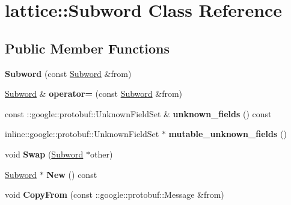 \hypertarget{classlattice_1_1Subword}{
\section{lattice::Subword Class Reference}
\label{classlattice_1_1Subword}
}
\subsection*{Public Member Functions}
\begin{DoxyCompactItemize}
\item 
\hypertarget{classlattice_1_1Subword_aa0e10ac48dd649a4dddf8e1a6ef9b810}{
{\bfseries Subword} (const \hyperlink{classlattice_1_1Subword}{Subword} \&from)}
\label{classlattice_1_1Subword_aa0e10ac48dd649a4dddf8e1a6ef9b810}

\item 
\hypertarget{classlattice_1_1Subword_a102d4bfb0a00050e86aa85c3d8d1ef20}{
\hyperlink{classlattice_1_1Subword}{Subword} \& {\bfseries operator=} (const \hyperlink{classlattice_1_1Subword}{Subword} \&from)}
\label{classlattice_1_1Subword_a102d4bfb0a00050e86aa85c3d8d1ef20}

\item 
\hypertarget{classlattice_1_1Subword_aff470f65348c81181cffe6659c9e3d17}{
const ::google::protobuf::UnknownFieldSet \& {\bfseries unknown\_\-fields} () const }
\label{classlattice_1_1Subword_aff470f65348c81181cffe6659c9e3d17}

\item 
\hypertarget{classlattice_1_1Subword_a1fc937024a7c533e1c51d7adedffa24d}{
inline::google::protobuf::UnknownFieldSet $\ast$ {\bfseries mutable\_\-unknown\_\-fields} ()}
\label{classlattice_1_1Subword_a1fc937024a7c533e1c51d7adedffa24d}

\item 
\hypertarget{classlattice_1_1Subword_aac745475adf60d00b6f8f37c69f443b0}{
void {\bfseries Swap} (\hyperlink{classlattice_1_1Subword}{Subword} $\ast$other)}
\label{classlattice_1_1Subword_aac745475adf60d00b6f8f37c69f443b0}

\item 
\hypertarget{classlattice_1_1Subword_a4cc85172f8246ed23ec94de0b6274825}{
\hyperlink{classlattice_1_1Subword}{Subword} $\ast$ {\bfseries New} () const }
\label{classlattice_1_1Subword_a4cc85172f8246ed23ec94de0b6274825}

\item 
\hypertarget{classlattice_1_1Subword_ab08febfe342e4382de8d9d42142b87b4}{
void {\bfseries CopyFrom} (const ::google::protobuf::Message \&from)}
\label{classlattice_1_1Subword_ab08febfe342e4382de8d9d42142b87b4}


\end{DoxyCompactItemize}
